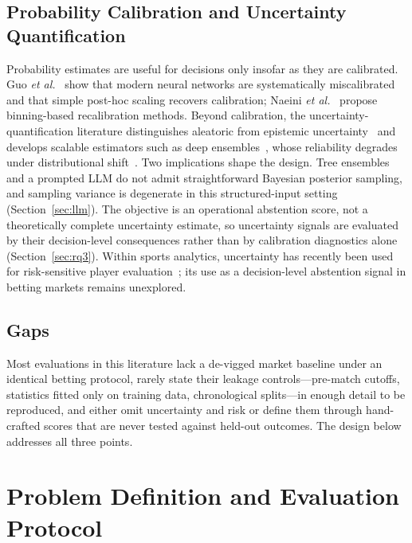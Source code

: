 \documentclass[10pt]{article}
\begin{document}
\subsection{Probability Calibration and Uncertainty Quantification}
Probability estimates are useful for decisions only insofar as they are
calibrated. Guo \emph{et al.}~\cite{guo2017} show that modern neural networks
are systematically miscalibrated and that simple post-hoc scaling recovers
calibration; Naeini \emph{et al.}~\cite{naeini2015} propose binning-based
recalibration methods. Beyond calibration, the uncertainty-quantification
literature distinguishes aleatoric from epistemic uncertainty~\cite{kendall2017}
and develops scalable estimators such as deep ensembles~\cite{lakshminarayanan2017},
whose reliability degrades under distributional shift~\cite{ovadia2019}. Two
implications shape the design. Tree ensembles and a prompted LLM do not admit
straightforward Bayesian posterior sampling, and sampling variance is degenerate
in this structured-input setting (Section~\ref{sec:llm}). The objective is an
operational abstention score, not a theoretically complete uncertainty estimate,
so uncertainty signals are evaluated by their decision-level consequences rather
than by calibration diagnostics alone (Section~\ref{sec:rq3}). Within sports analytics,
uncertainty has recently been used for risk-sensitive player
evaluation~\cite{liu2022}; its use as a decision-level abstention signal in
betting markets remains unexplored.

\subsection{Gaps}
Most evaluations in this literature lack a de-vigged market baseline under an
identical betting protocol, rarely state their leakage controls---pre-match
cutoffs, statistics fitted only on training data, chronological splits---in
enough detail to be reproduced, and either omit uncertainty and risk or define
them through hand-crafted scores that are never tested against held-out
outcomes. The design below addresses all three points.


\section{Problem Definition and Evaluation Protocol}
\label{sec:problem}
\end{document}
